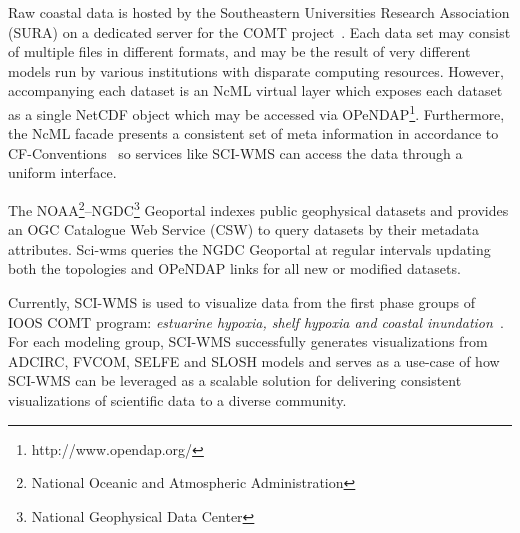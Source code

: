 \documentclass[11pt,twocolumn,twoside]{IEEEtran}
\newcommand{\comt}{COMT}
\newcommand{\ioos}{IOOS}
\newcommand{\sura}{SURA}
\newcommand{\ogc}{OGC}
\newcommand{\csw}{CSW}
\newcommand{\ncml}{NcML}
\newcommand{\noaa}{NOAA}
\newcommand{\ngdc}{NGDC}
\newcommand{\opendap}{OPeNDAP}
\newcommand{\netcdf}{NetCDF}
\newcommand{\sciwms}{SCI-WMS}
\newcommand{\Sciwms}{SCI-WMS}
\newcommand{\adcirc}{ADCIRC}
\newcommand{\fvcom}{FVCOM}
\newcommand{\selfe}{SELFE}
\newcommand{\slosh}{SLOSH}
\begin{document}
Raw coastal data is hosted by the Southeastern Universities Research
Association (\sura{}) on a dedicated server for the \comt{}
project~\cite{luettich12}. Each data set may consist of multiple files
in different formats, and may be the result of very different models
run by various institutions with disparate computing
resources. However, accompanying each dataset is an \ncml{} virtual
layer which exposes each dataset as a single \netcdf{} object which
may be accessed via
\opendap{}\footnote{http://www.opendap.org/}. Furthermore, the \ncml{}
facade presents a consistent set of meta information in accordance to
CF-Conventions~\cite{cf} so services like \sciwms{} can access the
data through a uniform interface.

The \noaa{}\footnote{National Oceanic and Atmospheric
  Administration}--\ngdc{}\footnote{National Geophysical Data Center}
Geoportal indexes public geophysical datasets and provides an \ogc{}
Catalogue Web Service (\csw{}) to query datasets by their metadata
attributes. Sci-wms queries the \ngdc{} Geoportal at regular intervals
updating both the topologies and \opendap{} links for all new or
modified datasets.


Currently, \Sciwms{} is used to visualize data from the first phase
groups of \ioos{} \comt{} program: {\em estuarine hypoxia, shelf hypoxia and
  coastal inundation}~\cite{luettich13}. For each modeling group,
\sciwms{} successfully generates visualizations from \adcirc{},
\fvcom{}, \selfe{} and \slosh{} models and serves as a use-case of how
\sciwms{} can be leveraged as a scalable solution for delivering
consistent visualizations of scientific data to a diverse community.
\end{document}

